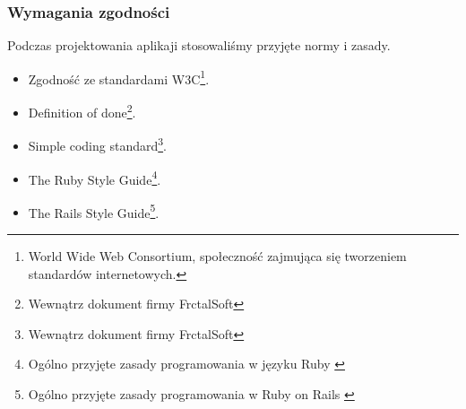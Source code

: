   \subsubsection{Wymagania zgodności}
    Podczas projektowania aplikaji stosowaliśmy przyjęte normy i zasady.
    \begin{itemize}
      \item Zgodność ze standardami W3C\footnote{World Wide Web Consortium, społeczność zajmująca się tworzeniem standardów internetowych.}.
      \item Definition of done\footnote{Wewnątrz dokument firmy FrctalSoft\cite{dod}}.
      \item Simple coding standard\footnote{Wewnątrz dokument firmy FrctalSoft\cite{scs}}.
      \item The Ruby Style Guide\footnote{Ogólno przyjęte zasady programowania w języku Ruby \cite{ruby_style_guide}}.
      \item The Rails Style Guide\footnote{Ogólno przyjęte zasady programowania w Ruby on Rails \cite{rails_style_guide}}.
    \end{itemize}

